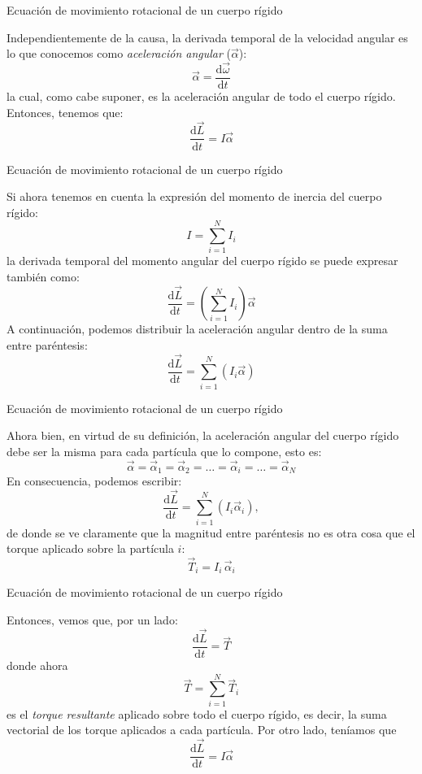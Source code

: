\documentclass[11pt,handout,aspectratio=1610]{beamer}
\newcommand{\fdiff}[2]{\dfrac{\text{d} #1}{\text{d} #2}}
\begin{document}
\begin{frame}{Ecuación de movimiento rotacional de un cuerpo rígido}

    Independientemente de la causa, la derivada temporal de la velocidad angular es lo que conocemos como \emph{aceleración angular} ($\vec{\alpha}$): $$ \vec{\alpha} = \fdiff{\vec{\omega}}{t}$$ la cual, como cabe suponer, es la aceleración angular de todo el cuerpo rígido. Entonces, tenemos que: $$ \fdiff{\vec{L}}{t} = I \vec{\alpha} $$ 
 
\end{frame}

\begin{frame}{Ecuación de movimiento rotacional de un cuerpo rígido}   
    
    Si ahora tenemos en cuenta la expresión del momento de inercia del cuerpo rígido: $$ I = \sum_{i=1}^{N} I_i $$ la derivada temporal del momento angular del cuerpo rígido se puede expresar también como: $$ \fdiff{\vec{L}}{t} = \left(\sum_{i=1}^{N} I_i \right) \vec{\alpha} $$ A continuación, podemos distribuir la aceleración angular dentro de la suma entre paréntesis: $$ \fdiff{\vec{L}}{t} = \sum_{i=1}^{N} \left(I_i\vec{\alpha}\right) $$

\end{frame}

\begin{frame}{Ecuación de movimiento rotacional de un cuerpo rígido}

    Ahora bien, en virtud de su definición, la aceleración angular del cuerpo rígido debe ser la misma para cada partícula que lo compone, esto es: $$ \vec{\alpha} = \vec{\alpha}_1 = \vec{\alpha}_2 = \ldots = \vec{\alpha}_i = \ldots = \vec{\alpha}_N $$ En consecuencia, podemos escribir: $$ \fdiff{\vec{L}}{t} = \sum_{i=1}^{N} \left(I_i \vec{\alpha}_i \right), $$ de donde se ve claramente que la magnitud entre paréntesis no es otra cosa que el torque aplicado sobre la partícula $i$: $$\vec{T}_i = I_i \, \vec{\alpha}_i$$

\end{frame}

\begin{frame}{Ecuación de movimiento rotacional de un cuerpo rígido}

    Entonces, vemos que, por un lado: $$ \fdiff{\vec{L}}{t} = \vec{T}$$ donde ahora $$ \vec{T} = \sum_{i=1}^{N} \vec{T}_i $$ es el \emph{torque resultante} aplicado sobre todo el cuerpo rígido, es decir, la suma vectorial de los torque aplicados a cada partícula. Por otro lado, teníamos que $$ \fdiff{\vec{L}}{t} = I \vec{\alpha} $$
    
\end{frame}
\end{document}
